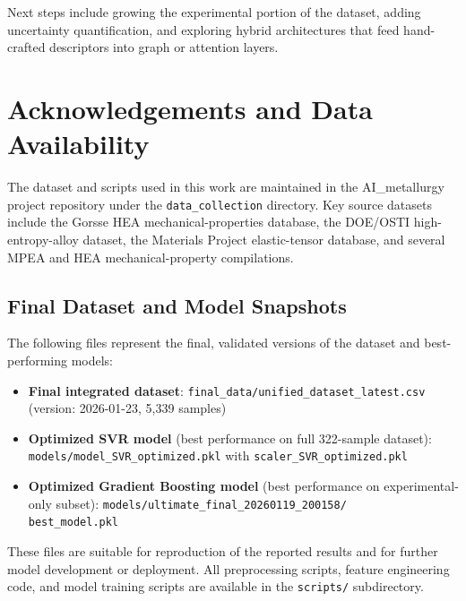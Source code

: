 \documentclass[11pt,a4paper]{article}
\begin{document}
Next steps include growing the experimental portion of the dataset, adding uncertainty quantification, and exploring hybrid architectures that feed hand-crafted descriptors into graph or attention layers.

\section*{Acknowledgements and Data Availability}

The dataset and scripts used in this work are maintained in the AI\_metallurgy project repository under the \texttt{data\_collection} directory. Key source datasets include the Gorsse HEA mechanical-properties database, the DOE/OSTI high-entropy-alloy dataset, the Materials Project elastic-tensor database, and several MPEA and HEA mechanical-property compilations.

\subsection*{Final Dataset and Model Snapshots}

The following files represent the final, validated versions of the dataset and best-performing models:

\begin{itemize}
  \item \textbf{Final integrated dataset}: \texttt{final\_data/unified\_dataset\_latest.csv} (version: 2026-01-23, 5{,}339 samples)
  \item \textbf{Optimized SVR model} (best performance on full 322-sample dataset): \texttt{models/model\_SVR\_optimized.pkl} with \texttt{scaler\_SVR\_optimized.pkl}
  \item \textbf{Optimized Gradient Boosting model} (best performance on experimental-only subset): \texttt{models/ultimate\_final\_20260119\_200158/}\\\texttt{best\_model.pkl}
\end{itemize}

These files are suitable for reproduction of the reported results and for further model development or deployment. All preprocessing scripts, feature engineering code, and model training scripts are available in the \texttt{scripts/} subdirectory.
\end{document}
